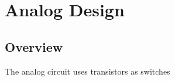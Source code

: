 \section{Analog Design}
\subsection{Overview}

The analog circuit uses transistors as switches 


\newpage